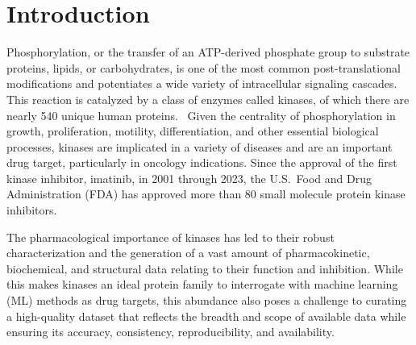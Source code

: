 \documentclass[9pt,lessons]{livecoms}
\begin{document}


\section{Introduction}

Phosphorylation, or the transfer of an ATP-derived phosphate group to substrate proteins, lipids, or carbohydrates, is one of the most common post-translational modifications and potentiates a wide variety of intracellular signaling cascades.~\cite{Ayala-Aguilera2022, Ramazi2021} 
This reaction is catalyzed by a class of enzymes called kinases, of which there are nearly 540 unique human proteins.~\cite{Eid2017} 
Given the centrality of phosphorylation in growth, proliferation, motility, differentiation, and other essential biological processes, kinases are implicated in a variety of diseases and are an important drug target, particularly in oncology indications. 
Since the approval of the first kinase inhibitor, imatinib, in 2001 through 2023, the U.S.\ Food and Drug Administration (FDA) has approved more than 80 small molecule protein kinase inhibitors.~\cite{roskoski2023pki}


The pharmacological importance of kinases has led to their robust characterization and the generation of a vast amount of pharmacokinetic, biochemical, and structural data relating to their function and inhibition. 
While this makes kinases an ideal protein family to interrogate with machine learning (ML) methods as drug targets, this abundance also poses a challenge to curating a high-quality dataset that reflects the breadth and scope of available data while ensuring its accuracy, consistency, reproducibility, and availability.
\end{document}
